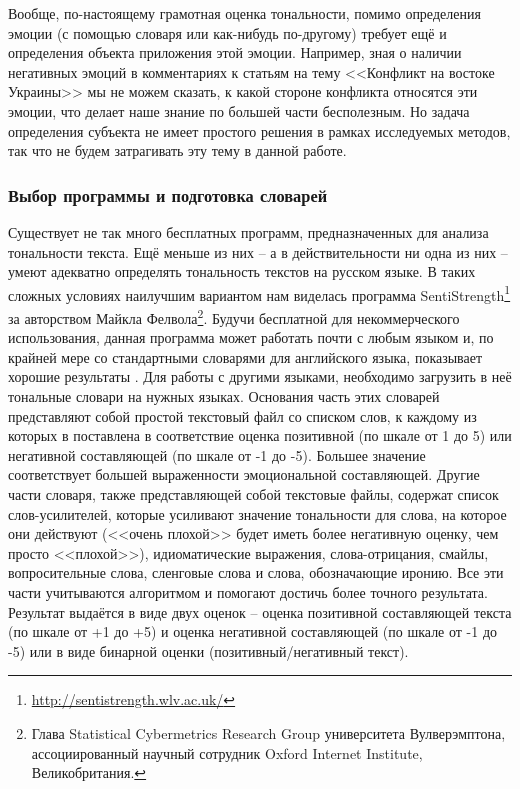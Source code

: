Вообще, по-настоящему грамотная оценка тональности, помимо определения эмоции (с помощью словаря или как-нибудь по-другому) требует ещё и определения объекта приложения этой эмоции. Например, зная о наличии негативных эмоций в комментариях к статьям на тему <<Конфликт на востоке Украины>> мы не можем сказать, к какой стороне конфликта относятся эти эмоции, что делает наше знание по большей части бесполезным. Но задача определения субъекта не имеет простого решения в рамках исследуемых методов, так что не будем затрагивать эту тему в данной работе.

\subsubsection{Выбор программы и подготовка словарей}
Существует не так много бесплатных программ, предназначенных для анализа тональности текста. Ещё меньше из них -- а в действительности ни одна из них -- умеют адекватно определять тональность текстов на русском языке. В таких сложных условиях наилучшим вариантом нам виделась программа SentiStrength\footnote{\href{http://sentistrength.wlv.ac.uk/ }{http://sentistrength.wlv.ac.uk/}} за авторством Майкла Фелвола\footnote{Глава Statistical Cybermetrics Research Group университета Вулверэмптона, ассоциированный научный сотрудник Oxford Internet Institute, Великобритания.}. Будучи бесплатной для некоммерческого использования, данная программа может работать почти с любым языком и, по крайней мере со стандартными словарями для английского языка, показывает хорошие результаты \cite{SentiStrength}. Для работы с другими языками, необходимо загрузить в неё тональные словари на нужных языках. Основания часть этих словарей представляют собой простой текстовый файл со списком слов, к каждому из которых в поставлена в соответствие оценка позитивной (по шкале от 1 до 5) или негативной составляющей (по шкале от -1 до -5). Большее значение соответствует большей выраженности эмоциональной составляющей. Другие части словаря, также представляющей собой текстовые файлы, содержат список слов-усилителей, которые усиливают значение тональности для слова, на которое они действуют (<<очень плохой>> будет иметь более негативную оценку, чем просто <<плохой>>), идиоматические выражения, слова-отрицания, смайлы, вопросительные слова, сленговые слова и слова, обозначающие иронию. Все эти части учитываются алгоритмом и помогают достичь более точного результата. Результат выдаётся в виде двух оценок – оценка позитивной составляющей текста (по шкале от +1 до +5) и оценка негативной составляющей (по шкале от -1 до -5) или в виде бинарной оценки (позитивный/негативный текст).

